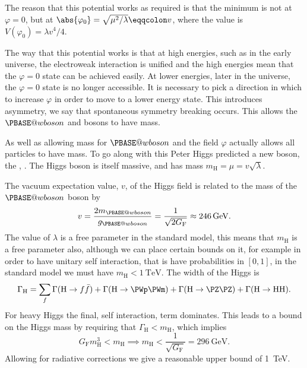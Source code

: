 \documentclass[fleqn]{NotesClass}
\makeatletter
\newcommand{\Pwboson}{\ensuremath{\PBASE@wboson}}
\newcommand{\PW}{\Pwboson}
\newcommand{\PH}{\ensuremath{\mathrm{H}}}
\newcommand*{\fermiconst}{G_{\mathrm{F}}}
\makeatother
\begin{document}
    The reason that this potential works as required is that the minimum is not at \(\varphi = 0\), but at \(\abs{\varphi_0} = \sqrt{\mu^2/\lambda} \eqqcolon v\), where the value is \(V(\varphi_{0}) = \lambda v^4/4\).
    
    The way that this potential works is that at high energies, such as in the early universe, the electroweak interaction is unified and the high energies mean that the \(\varphi = 0\) state can be achieved easily.
    At lower energies, later in the universe, the \(\varphi = 0\) state is no longer accessible.
    It is necessary to pick a direction in which to increase \(\varphi\) in order to move to a lower energy state.
    This introduces asymmetry, we say that spontaneous symmetry breaking occurs.
    This allows the \PW{} and \PZ{} bosons to have mass.
    
    As well as allowing mass for \PW{} and \PZ{} the field \(\varphi\) actually allows all particles to have mass.
    To go along with this Peter Higgs predicted a new boson, the , \PHzero.
    The Higgs boson is itself massive, and has mass \(m_{\PH} = \mu = v\sqrt{\lambda}\).
    
    The vacuum expectation value, \(v\), of the Higgs field is related to the mass of the \PW{} boson by
    \begin{equation}
        v = \frac{2m_{\PW}}{g_{\PW}} = \frac{1}{\sqrt{2\fermiconst}} \approx \qty{246}{\giga\electronvolt}.
    \end{equation}
    The value of \(\lambda\) is a free parameter in the standard model, this means that \(m_{\PH}\) is a free parameter also, although we can place certain bounds on it, for example in order to have unitary self interaction, that is have probabilities in \([0, 1]\), in the standard model we must have \(m_{\PH} < \qty{1}{\tera\electronvolt}\).
    The width of the Higgs is
    \begin{equation}
        \Gamma_{\PH} = \sum_f \Gamma(\PH \to f\bar{f}) + \Gamma(\PH \to \PWp\PWm) + \Gamma(\PH \to \PZ\PZ) + \Gamma(\PH \to \PH\PH).
    \end{equation}
    For heavy Higgs the final, self interaction, term dominates.
    This leads to a bound on the Higgs mass by requiring that \(\Gamma_{\PH} < m_{\PH}\), which implies
    \begin{equation}
        \fermiconst m_{\PH}^3 < m_{\PH} \implies m_{\PH} < \frac{1}{\sqrt{\fermiconst}} = \qty{296}{\giga\electronvolt}.
    \end{equation}
    Allowing for radiative corrections we give a reasonable upper bound of \qty{1}{\tera\electronvolt}.
    
\end{document}
